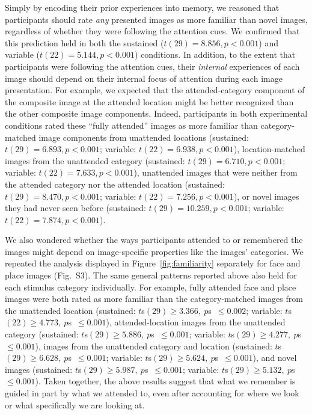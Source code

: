 \documentclass[english]{article}
\newcommand{\ratingsByCategory}{S3}
\begin{document}
Simply by encoding their prior experiences into memory, we reasoned that
participants should rate \textit{any} presented images as more familiar than
novel images, regardless of whether they were following the attention cues. We
confirmed that this prediction held in both the sustained ($t(29) = 8.856, p <
0.001$) and variable ($t(22) = 5.144, p < 0.001$) conditions. In addition, to
the extent that participants were following the attention cues, their
\textit{internal} experiences of each image should depend on their internal
focus of attention during each image presentation. For example, we expected
that the attended-category component of the composite image at the attended
location might be better recognized than the other composite image components.
Indeed, participants in both experimental conditions rated these ``fully
attended'' images as more familiar than category-matched image components from
unattended locations (sustained: $t(29) = 6.893, p < 0.001$; variable: $t(22) =
6.938, p < 0.001$), location-matched images from the unattended category
(sustained: $t(29) = 6.710, p < 0.001$; variable: $t(22) = 7.633, p < 0.001$),
unattended images that were neither from the attended category nor the attended
location (sustained: $t(29) = 8.470, p < 0.001$; variable: $t(22) = 7.256, p <
0.001$), or novel images they had never seen before (sustained: $t(29) =
10.259, p < 0.001$; variable: $t(22) = 7.874, p < 0.001$).

We also wondered whether the ways participants attended to or remembered the
images might depend on image-specific properties like the images' categories.
We repeated the analysis displayed in Figure~\ref{fig:familiarity} separately
for face and place images (Fig.~\ratingsByCategory). The same general patterns
reported above also held for each stimulus category individually. For example,
fully attended face and place images were both rated as more familiar than the
category-matched images from the unattended location (sustained: $t$s$(29) \geq
3.366,~p$s~$\leq 0.002$; variable: $t$s$(22) \geq 4.773,~p$s~$\leq 0.001$),
attended-location images from the unattended category (sustained: $t$s$(29)
\geq 5.886,~p$s~$\leq 0.001$; variable: $t$s$(29) \geq 4.277,~p$s~$\leq
0.001$), images from the unattended category and location (sustained: $t$s$(29)
\geq 6.628,~p$s~$\leq 0.001$; variable: $t$s$(29) \geq 5.624,~p$s~$\leq
0.001$), and novel images (sustained: $t$s$(29) \geq 5.987,~p$s~$\leq 0.001$;
variable: $t$s$(29) \geq 5.132,~p$s~$\leq 0.001$). Taken together, the above
results suggest that what we remember is guided in part by what we attended to,
even after accounting for where we look or what specifically we are looking at.
\end{document}
